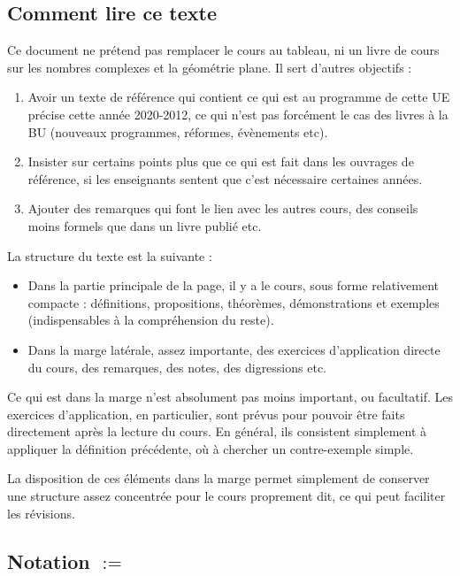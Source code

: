 \documentclass[11pt,a4paper,oneside]{book}
\theoremstyle{definition}
\theoremstyle{plain}
\begin{document}
\subsection{Comment lire ce texte}

Ce document ne prétend pas remplacer le cours au tableau, ni un livre de cours sur les nombres complexes et la géométrie plane. Il sert d'autres objectifs :



\begin{enumerate}
\item Avoir un texte de référence qui contient ce qui est au programme de cette UE précise cette année 2020-2012, ce qui n'est pas forcément le cas des livres à la BU (nouveaux programmes, réformes, évènements etc).
\item Insister sur certains points plus que ce qui est fait dans les ouvrages de référence, si les enseignants sentent que c'est nécessaire certaines années. 
\item Ajouter des remarques qui font le lien avec les autres cours, des conseils moins formels que dans un livre publié etc.
\end{enumerate}

La structure du texte est la suivante : 
\begin{itemize}
\item Dans la partie principale de la page, il y a le cours, sous forme relativement compacte : définitions, propositions, théorèmes, démonstrations et exemples (indispensables à la compréhension du reste).
\item Dans la marge latérale, assez importante, des exercices d'application directe du cours, des remarques, des notes, des digressions etc.
\end{itemize}

\begin{mdframed}
Ce qui est dans la marge n'est absolument pas \og moins important\fg, ou facultatif. Les exercices d'application, en particulier, sont prévus pour pouvoir être faits directement après la lecture du cours. En général, ils consistent simplement à appliquer la définition précédente, où à chercher un contre-exemple simple.

La disposition de ces éléments dans la marge permet simplement de conserver une structure assez concentrée pour le cours proprement dit, ce qui peut faciliter les révisions.
\end{mdframed}

\subsection{Notation \og $:=$\fg}
\end{document}
